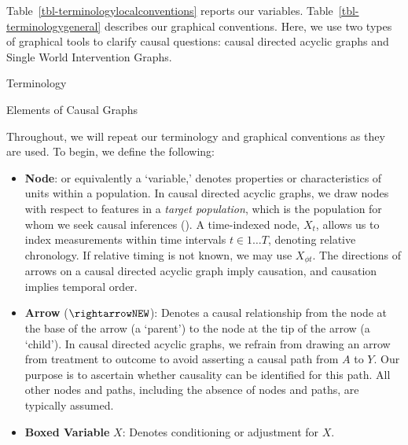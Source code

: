 \documentclass[
  single column]{article}
\begin{document}
Table~\ref{tbl-terminologylocalconventions} reports our variables.
Table~\ref{tbl-terminologygeneral} describes our graphical conventions.
Here, we use two types of graphical tools to clarify causal questions:
causal directed acyclic graphs and Single World Intervention Graphs.

\begin{table}

\caption{\label{tbl-terminologylocalconventions}Terminology}

\centering{

\terminologylocalconventions

}

\end{table}%

\begin{table}

\caption{\label{tbl-terminologygeneral}Elements of Causal Graphs}

\centering{

\terminologygeneral

}

\end{table}%

Throughout, we will repeat our terminology and graphical conventions as
they are used. To begin, we define the following:

\begin{itemize}
\item
  \textbf{Node}: or equivalently a `variable,' denotes properties or
  characteristics of units within a population. In causal directed
  acyclic graphs, we draw nodes with respect to features in a
  \emph{target population}, which is the population for whom we seek
  causal inferences (). A time-indexed node, \(X_t\), allows us to index measurements
  within time intervals \(t \in 1\dots T\), denoting relative
  chronology. If relative timing is not known, we may use
  \(X_{\phi t}\). The directions of arrows on a causal directed acyclic
  graph imply causation, and causation implies temporal order.
\item
  \textbf{Arrow} (\(\rightarrowNEW\)): Denotes a causal relationship
  from the node at the base of the arrow (a `parent') to the node at the
  tip of the arrow (a `child'). In causal directed acyclic graphs, we
  refrain from drawing an arrow from treatment to outcome to avoid
  asserting a causal path from \(A\) to \(Y\). Our purpose is to
  ascertain whether causality can be identified for this path. All other
  nodes and paths, including the absence of nodes and paths, are
  typically assumed.
\item
  \textbf{Boxed Variable} \(\boxed{X}\): Denotes conditioning or
  adjustment for \(X\).
\end{itemize}
\end{document}
